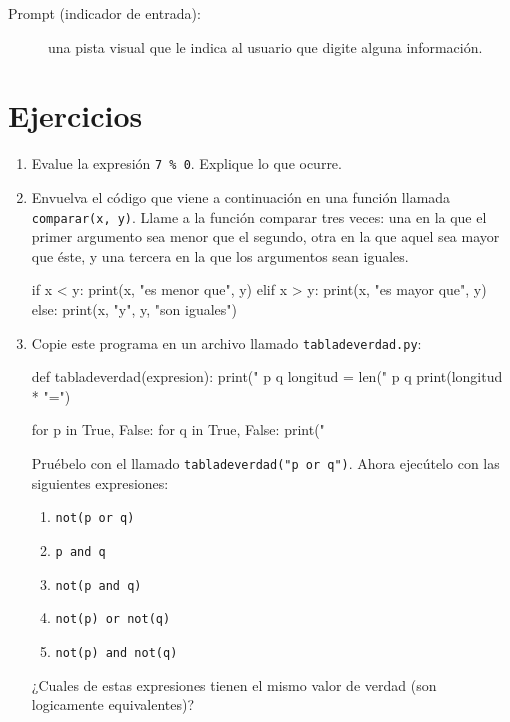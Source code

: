\begin{description}
	\item[Prompt (indicador de entrada):]  una pista visual que le indica al 
	usuario que
	digite alguna información.
	
\end{description}

\section{Ejercicios}
\begin{enumerate}
	\item Evalue la expresión \verb+7 % 0+. Explique lo que ocurre.
	
	\item Envuelva el código que viene a continuación en una función llamada 
	\verb+comparar(x, y)+. Llame a la función comparar tres veces: 
	una en la que el primer argumento sea menor que el segundo, otra en la que 
	aquel sea mayor que éste, y 
	una tercera en la que los argumentos sean iguales.
	
	\begin{pythoncode} 
if x < y:
    print(x, "es menor que", y)
elif x > y:
    print(x, "es mayor que", y)
else:
    print(x, "y", y, "son iguales")
	\end{pythoncode}
	
	\item Copie este programa en un archivo llamado \texttt{tabladeverdad.py}:
	\begin{pythoncode}
def tabladeverdad(expresion):
    print(" p      q      %
    longitud = len(" p      q      %
    print(longitud * "=")

    for p in True, False:
        for q in True, False:
            print("%
	
	\end{pythoncode}
	Pruébelo con el llamado \verb+tabladeverdad("p or q")+. Ahora ejecútelo con 
	las siguientes expresiones:

	\begin{enumerate}
		\item \texttt{not(p or q)}
		\item \texttt{p and q}
		\item \texttt{not(p and q)}
		\item \texttt{not(p) or not(q)}
		\item \texttt{not(p) and not(q)}
	\end{enumerate}
	
	¿Cuales de estas expresiones tienen el mismo valor de verdad (son 
	logicamente equivalentes)?
\end{enumerate}

